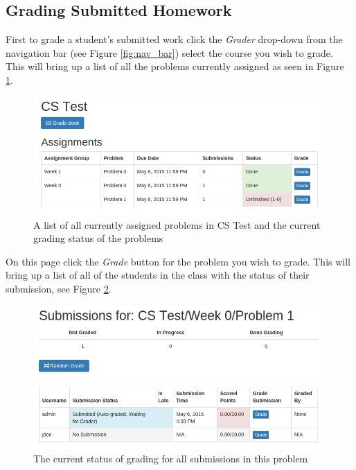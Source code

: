 \documentclass[11pt]{report}
\begin{document}
\subsection{Grading Submitted Homework}
First to grade a student's submitted work click the \emph{Grader} drop-down from the navigation bar
(see Figure \ref{fig:nav_bar}) select the course you wish to grade. This will bring up a list of all the
problems currently assigned as seen in Figure \ref{fig:grutor_problems}.

\begin{figure}[h]
\centering
\includegraphics[width=\textwidth,height=\textheight,keepaspectratio]{diagrams/grutor_problems}
\caption{A list of all currently assigned problems in CS Test and the current grading status of the problems}
\label{fig:grutor_problems}
\end{figure}

On this page click the \emph{Grade} button for the problem you wish to grade. This will bring up a list of all
of the students in the class with the status of their submission, see Figure \ref{fig:grutor_problem_list}.

\begin{figure}[h]
\centering
\includegraphics[width=\textwidth,height=\textheight,keepaspectratio]{diagrams/grutor_problem_list}
\caption{The current status of grading for all submissions in this problem}
\label{fig:grutor_problem_list}
\end{figure}
\end{document}
